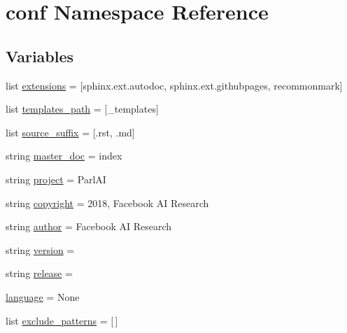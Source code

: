 \hypertarget{namespaceconf}{}\section{conf Namespace Reference}
\label{namespaceconf}
\subsection*{Variables}
\begin{DoxyCompactItemize}
\item 
list \hyperlink{namespaceconf_ae475e080536acb271a0a0efe56c3ba42}{extensions} = \mbox{[}\textquotesingle{}sphinx.\+ext.\+autodoc\textquotesingle{}, \textquotesingle{}sphinx.\+ext.\+githubpages\textquotesingle{}, \textquotesingle{}recommonmark\textquotesingle{}\mbox{]}
\item 
list \hyperlink{namespaceconf_ae850ae634911b713e036b43894fdd525}{templates\+\_\+path} = \mbox{[}\textquotesingle{}\+\_\+templates\textquotesingle{}\mbox{]}
\item 
list \hyperlink{namespaceconf_a3cb6867401ccd3f25a28d4270f4703c1}{source\+\_\+suffix} = \mbox{[}\textquotesingle{}.rst\textquotesingle{}, \textquotesingle{}.md\textquotesingle{}\mbox{]}
\item 
string \hyperlink{namespaceconf_a6fcd7e5236f355b1e1a55f9d95988810}{master\+\_\+doc} = \textquotesingle{}index\textquotesingle{}
\item 
string \hyperlink{namespaceconf_a45653c983098153b78e33600e39230eb}{project} = \textquotesingle{}Parl\+AI\textquotesingle{}
\item 
string \hyperlink{namespaceconf_a33fa97cf51dcb25970fbf53f10159589}{copyright} = \textquotesingle{}2018, Facebook AI Research\textquotesingle{}
\item 
string \hyperlink{namespaceconf_a637c239d256432248aa8d9f3ab0b8c52}{author} = \textquotesingle{}Facebook AI Research\textquotesingle{}
\item 
string \hyperlink{namespaceconf_ade15c5b54093b64d7c428ec19ca5b1cb}{version} = \textquotesingle{}\textquotesingle{}
\item 
string \hyperlink{namespaceconf_a325dc746d8bf05c54d26351c35a21d90}{release} = \textquotesingle{}\textquotesingle{}
\item 
\hyperlink{namespaceconf_ad76a2e6d7bfa880ebb4042c08e8b4e12}{language} = None
\item 
list \hyperlink{namespaceconf_a7ad48fb6f3e9b129c02346ea0d3527c1}{exclude\+\_\+patterns} = \mbox{[}$\,$\mbox{]}
\item 

\end{DoxyCompactItemize}
